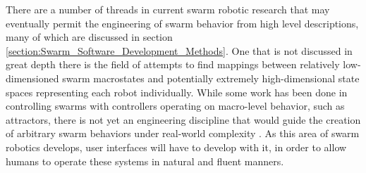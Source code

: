 There are a number of threads in current swarm robotic research that may eventually permit the engineering of swarm behavior from high level descriptions, many of which are discussed in section \ref{section:Swarm_Software_Development_Methods}. 
One that is not discussed in great depth there is the field of attempts to find mappings between relatively low-dimensioned swarm macrostates and potentially extremely high-dimensional state spaces representing each robot individually. 
While some work has been done in controlling swarms with controllers operating on macro-level behavior, such as attractors, there is not yet an engineering discipline that would guide the creation of arbitrary swarm behaviors under real-world complexity \citep{brown2014human}. 
As this area of swarm robotics develops, user interfaces will have to develop with it, in order to allow humans to operate these systems in natural and fluent manners. 